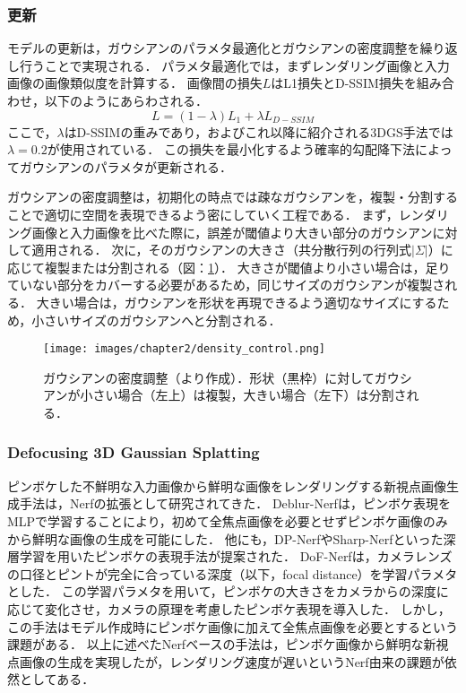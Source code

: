 \subsubsection*{更新}
モデルの更新は，ガウシアンのパラメタ最適化とガウシアンの密度調整を繰り返し行うことで実現される．
パラメタ最適化では，まずレンダリング画像と入力画像の画像類似度を計算する．
画像間の損失$L$はL1損失とD-SSIM損失\cite{d-ssim}を組み合わせ，以下のようにあらわされる．
\begin{equation}
  L = (1 - \lambda)L_1 + {\lambda}L_{D-SSIM}
\end{equation}
ここで，$\lambda$はD-SSIMの重みであり，\cite{3dgs}およびこれ以降に紹介される3DGS手法では$\lambda = 0.2$が使用されている．
この損失を最小化するよう確率的勾配降下法によってガウシアンのパラメタが更新される．\par

ガウシアンの密度調整は，初期化の時点では疎なガウシアンを，複製・分割することで適切に空間を表現できるよう密にしていく工程である．
まず，レンダリング画像と入力画像を比べた際に，誤差が閾値より大きい部分のガウシアンに対して適用される．
次に，そのガウシアンの大きさ（共分散行列の行列式$|\Sigma|$）に応じて複製または分割される（図：\ref{fig:density_control}）．
大きさが閾値より小さい場合は，足りていない部分をカバーする必要があるため，同じサイズのガウシアンが複製される．
大きい場合は，ガウシアンを形状を再現できるよう適切なサイズにするため，小さいサイズのガウシアンへと分割される．

\begin{figure}[h]
    \centering
    \texttt{[image: images/chapter2/density\_control.png]}
    \caption[ガウシアンの密度調整]{ガウシアンの密度調整（\cite{3dgs}より作成）．形状（黒枠）に対してガウシアンが小さい場合（左上）は複製，大きい場合（左下）は分割される．}
    \label{fig:density_control}
\end{figure}

\subsubsection{Defocusing 3D Gaussian Splatting}\label{subsec:defocusing_3dgs}
ピンボケした不鮮明な入力画像から鮮明な画像をレンダリングする新視点画像生成手法は，Nerfの拡張として研究されてきた．
Deblur-Nerf\cite{deblur-nerf}は，ピンボケ表現をMLPで学習することにより，初めて全焦点画像を必要とせずピンボケ画像のみから鮮明な画像の生成を可能にした．
他にも，DP-Nerf\cite{dp-nerf}やSharp-Nerf\cite{sharp-nerf}といった深層学習を用いたピンボケの表現手法が提案された．
DoF-Nerf\cite{dof-nerf}は，カメラレンズの口径とピントが完全に合っている深度（以下，focal distance）を学習パラメタとした．
この学習パラメタを用いて，ピンボケの大きさをカメラからの深度に応じて変化させ，カメラの原理を考慮したピンボケ表現を導入した．
しかし，この手法はモデル作成時にピンボケ画像に加えて全焦点画像を必要とするという課題がある．
以上に述べたNerfベースの手法は，ピンボケ画像から鮮明な新視点画像の生成を実現したが，レンダリング速度が遅いというNerf由来の課題が依然としてある．\par

